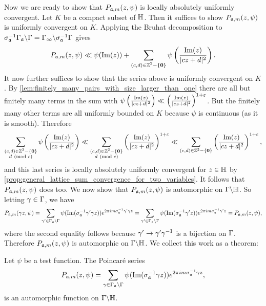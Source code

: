 \documentclass[12pt,oneside]{book}
\begin{document}
    Now we are ready to show that $P_{\mathfrak{a},m}(z,\psi)$ is locally absolutely uniformly convergent. Let $K$ be a compact subset of $\mathbb{H}$. Then it suffices to show $P_{\mathfrak{a},m}(z,\psi)$ is uniformly convergent on $K$. Applying the Bruhat decomposition to $\sigma_{\mathfrak{a}}^{-1}\Gamma_{\mathfrak{a}}\backslash\Gamma = \Gamma_{\infty}\backslash\sigma_{\mathfrak{a}}^{-1}\Gamma$ gives
    \[
      P_{\mathfrak{a},m}(z,\psi) \ll \psi(\mathrm{Im}(z))+\sum_{\substack{(c,d) \in \mathbb{Z}^{2}-\{\mathbf{0}\}}}\psi\left(\frac{\mathrm{Im}(z)}{|cz+d|^{2}}\right).
    \]
    It now further suffices to show that the series above is uniformly convergent on $K$. By \cref{lem:finitely_many_pairs_with_size_larger_than_one} there are all but finitely many terms in the sum with $\psi\left(\frac{\mathrm{Im}(z)}{|cz+d|^{2}}\right) \ll \left(\frac{\mathrm{Im}(z)}{|cz+d|^{2}}\right)^{1+\varepsilon}$. But the finitely many other terms are all uniformly bounded on $K$ because $\psi$ is continuous (as it is smooth). Therefore
    \[
      \sum_{\substack{(c,d) \in \mathbb{Z}^{2}-\{\mathbf{0}\} \\ d \ \left(\text{mod }c\right)}}\psi\left(\frac{\mathrm{Im}(z)}{|cz+d|^{2}}\right) \ll \sum_{\substack{(c,d) \in \mathbb{Z}^{2}-\{\mathbf{0}\} \\ d \ \left(\text{mod }c\right)}}\left(\frac{\mathrm{Im}(z)}{|cz+d|^{2}}\right)^{1+\varepsilon} \ll \sum_{(c,d) \in \mathbb{Z}^{2}-\{\mathbf{0}\}}\left(\frac{\mathrm{Im}(z)}{|cz+d|^{2}}\right)^{1+\varepsilon},
    \]
    and this last series is locally absolutely uniformly convergent for $z \in \mathbb{H}$ by \cref{prop:general_lattice_sum_convergence_for_two_variables}. It follows that $P_{\mathfrak{a},m}(z,\psi)$ does too. We now show that $P_{\mathfrak{a},m}(z,\psi)$ is automorphic on $\Gamma\backslash\mathbb{H}$. So letting $\gamma \in \Gamma$, we have
    \[
      P_{\mathfrak{a},m}(\gamma z,\psi) = \sum_{\gamma' \in \Gamma_{\mathfrak{a}}\backslash\Gamma}\psi(\mathrm{Im}(\sigma_{\mathfrak{a}}^{-1}\gamma'\gamma z))e^{2\pi im\sigma_{\mathfrak{a}}^{-1}\gamma'\gamma z} = \sum_{\gamma' \in \Gamma_{\mathfrak{a}}\backslash\Gamma}\psi(\mathrm{Im}(\sigma_{\mathfrak{a}}^{-1}\gamma' z))e^{2\pi im\sigma_{\mathfrak{a}}^{-1}\gamma' z} = P_{\mathfrak{a},m}(z,\psi),
    \]
    where the second equality follows because $\gamma' \to \gamma'\gamma^{-1}$ is a bijection on $\Gamma$. Therefore $P_{\mathfrak{a},m}(z,\psi)$ is automorphic on $\Gamma\backslash\mathbb{H}$. We collect this work as a theorem:

    \begin{theorem}
      Let $\psi$ be a test function. The Poincar\'e series
      \[
        P_{\mathfrak{a},m}(z,\psi) = \sum_{\gamma \in \Gamma_{\mathfrak{a}}\backslash\Gamma}\psi(\mathrm{Im}(\sigma_{\mathfrak{a}}^{-1}\gamma z))e^{2\pi im\sigma_{\mathfrak{a}}^{-1}\gamma z},
      \]
      is an automorphic function on $\Gamma\backslash\mathbb{H}$.
    \end{theorem}

  
\end{document}
